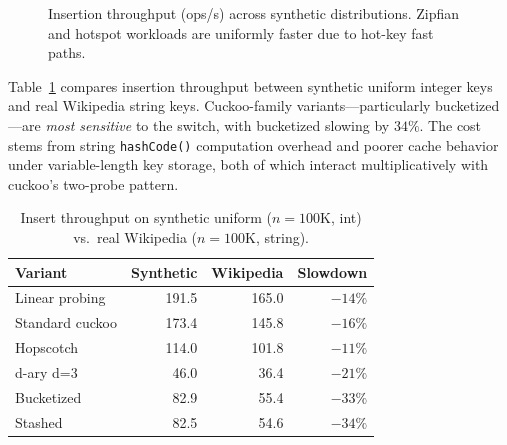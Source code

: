 \documentclass[10pt,journal,compsoc]{IEEEtran}
\begin{document}
\begin{figure}[t]
\centering
{}
\caption{Insertion throughput (ops/s) across synthetic distributions. Zipfian and hotspot workloads are uniformly faster due to hot-key fast paths.}
\label{fig:h5}
\end{figure}

Table~\ref{tab:realdata} compares insertion throughput between synthetic uniform integer keys and real Wikipedia string keys. Cuckoo-family variants---particularly bucketized---are \emph{most sensitive} to the switch, with bucketized slowing by $34\%$. The cost stems from string \texttt{hashCode()} computation overhead and poorer cache behavior under variable-length key storage, both of which interact multiplicatively with cuckoo's two-probe pattern.

\begin{table}[h]
\centering
\caption{Insert throughput on synthetic uniform ($n=100\mathrm{K}$, int) vs.\ real Wikipedia ($n=100\mathrm{K}$, string).}
\label{tab:realdata}
\begin{tabular}{@{}lrrr@{}}
\toprule
Variant & Synthetic & Wikipedia & Slowdown \\
\midrule
Linear probing    & 191.5 & 165.0 & $-14\%$ \\
Standard cuckoo   & 173.4 & 145.8 & $-16\%$ \\
Hopscotch         & 114.0 & 101.8 & $-11\%$ \\
d-ary d=3 &  46.0 &  36.4 & $-21\%$ \\
Bucketized        &  82.9 &  55.4 & $-33\%$ \\
Stashed           &  82.5 &  54.6 & $-34\%$ \\
\bottomrule
\end{tabular}
\end{table}
\end{document}
